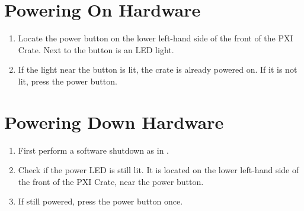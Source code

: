 \section{Powering On Hardware}
\label{sec:op_pxi:poweron}
\begin{enumerate}
\item Locate the power button on the lower left-hand side of the front of the PXI Crate.  Next to the button is an LED light.
\item If the light near the button is lit, the crate is already powered on.  If it is not lit, press the power button.
\end{enumerate}


\section{Powering Down Hardware}
\label{sec:op_pxi:poweroff}
\begin{enumerate}
\item First perform a software shutdown as in .
\item Check if the power LED is still lit.  It is located on the lower left-hand side of the front of the PXI Crate, near the power button.
\item If still powered, press the power button once.
\end{enumerate}


